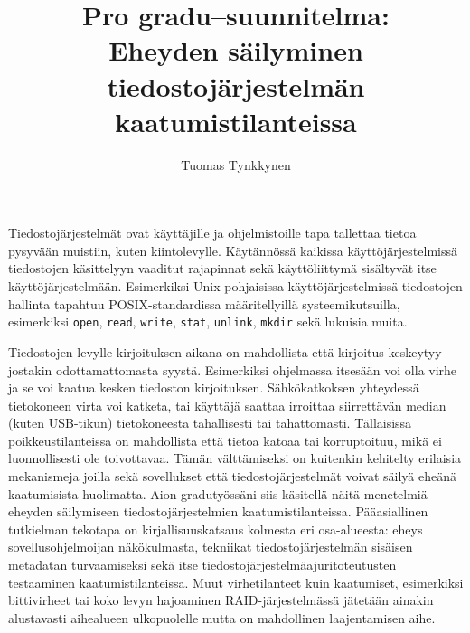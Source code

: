 \documentclass[a4paper]{article}
\title{Pro gradu--suunnitelma: \\ Eheyden säilyminen tiedostojärjestelmän kaatumistilanteissa}
\author{Tuomas Tynkkynen}
\begin{document}
\maketitle

Tiedostojärjestelmät ovat käyttäjille ja ohjelmistoille tapa tallettaa tietoa pysyvään muistiin, kuten kiintolevylle.
Käytännössä kaikissa käyttöjärjestelmissä tiedostojen käsittelyyn vaaditut rajapinnat sekä käyttöliittymä
sisältyvät itse käyttöjärjestelmään.
Esimerkiksi Unix-pohjaisissa käyttöjärjestelmissä tiedostojen hallinta tapahtuu POSIX-standardissa
määritellyillä systeemikutsuilla, esimerkiksi \texttt{open}, \texttt{read}, \texttt{write}, \texttt{stat}, \texttt{unlink}, \texttt{mkdir}
sekä lukuisia muita.

Tiedostojen levylle kirjoituksen aikana on mahdollista että kirjoitus keskeytyy jostakin odottamattomasta syystä.
Esimerkiksi ohjelmassa itsesään voi olla virhe ja se voi kaatua kesken tiedoston kirjoituksen.
Sähkökatkoksen yhteydessä tietokoneen virta voi katketa,
tai käyttäjä saattaa irroittaa siirrettävän median (kuten USB-tikun) tietokoneesta tahallisesti tai tahattomasti.
Tällaisissa poikkeustilanteissa on mahdollista että tietoa katoaa tai korruptoituu,
mikä ei luonnollisesti ole toivottavaa.
Tämän välttämiseksi on kuitenkin kehitelty erilaisia mekanismeja
joilla sekä sovellukset että tiedostojärjestelmät voivat säilyä eheänä kaatumisista huolimatta.
Aion gradutyössäni siis käsitellä näitä menetelmiä eheyden säilymiseen tiedostojärjestelmien kaatumistilanteissa.
Pääasiallinen tutkielman tekotapa on kirjallisuuskatsaus kolmesta eri osa-alueesta:
eheys sovellusohjelmoijan näkökulmasta,
tekniikat tiedostojärjestelmän sisäisen metadatan turvaamiseksi
sekä itse tiedostojärjestelmäajuritoteutusten testaaminen kaatumistilanteissa.
Muut virhetilanteet kuin kaatumiset,
esimerkiksi bittivirheet tai koko levyn hajoaminen RAID-järjestelmässä
jätetään ainakin alustavasti aihealueen ulkopuolelle mutta on mahdollinen laajentamisen aihe.
\end{document}
